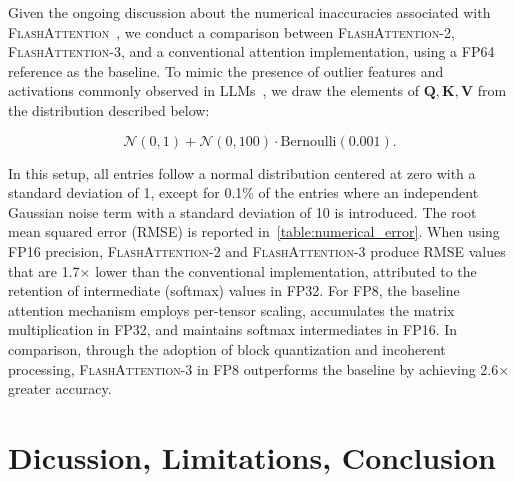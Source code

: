 Given the ongoing discussion about the numerical inaccuracies associated with \textsc{FlashAttention}~\citep{golden2024flash}, we conduct a comparison between \textsc{FlashAttention-2}, \textsc{FlashAttention-3}, and a conventional attention implementation, using a FP64 reference as the baseline. To mimic the presence of outlier features and activations commonly observed in LLMs~\citep{dettmers2208llm, sun2024massive}, we draw the elements of $\mathbf{Q}, \mathbf{K}, \mathbf{V}$ from the distribution described below:

\begin{equation*}
  \mathcal{N}(0, 1) + \mathcal{N}(0, 100) \cdot \mathrm{Bernoulli}(0.001).
\end{equation*}

In this setup, all entries follow a normal distribution centered at zero with a standard deviation of 1, except for 0.1\% of the entries where an independent Gaussian noise term with a standard deviation of 10 is introduced. The root mean squared error (RMSE) is reported in~\cref{table:numerical_error}. When using FP16 precision, \textsc{FlashAttention-2} and \textsc{FlashAttention-3} produce RMSE values that are 1.7$\times$ lower than the conventional implementation, attributed to the retention of intermediate (softmax) values in FP32. For FP8, the baseline attention mechanism employs per-tensor scaling, accumulates the matrix multiplication in FP32, and maintains softmax intermediates in FP16. In comparison, through the adoption of block quantization and incoherent processing, \textsc{FlashAttention-3} in FP8 outperforms the baseline by achieving 2.6$\times$ greater accuracy.

\section{Dicussion, Limitations, Conclusion}
\label{sec:discussion}

